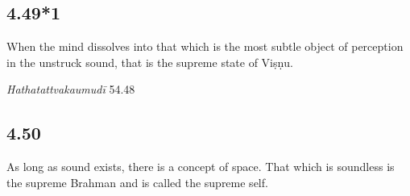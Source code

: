\begin{ekdosis}
\begin{philcomm}[hp04_049]
\end{philcomm}


\subsection*{4.49*1}
\begin{translation}[hp04_049]
When the mind dissolves into that which is the most subtle object of perception in the unstruck sound, that is the supreme state of Viṣṇu.
\end{translation}


\begin{testimonia}[hp04_049*1]
\emph{Hathatattvakaumudī} 54.48
\begin{versinnote}
\end{versinnote}

\end{testimonia}


\subsection*{4.50}
\begin{translation}[hp04_050]
As long as sound exists, there is a concept of space. That which is soundless is the supreme Brahman and is called the supreme self.
\end{translation}


\end{ekdosis}
